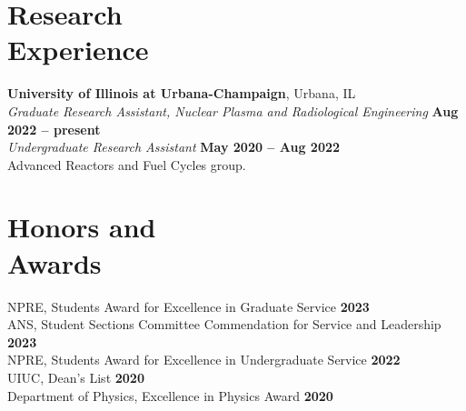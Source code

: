 \documentclass[margin,line]{resume}
\begin{document}
\begin{resume}
    \section{\mysidestyle Research\\Experience}
    \textbf{University of Illinois at Urbana-Champaign}, Urbana, IL\\
                \textsl{Graduate Research Assistant, Nuclear Plasma and Radiological Engineering} \hfill \textbf{Aug 2022 -- present}\\
                \textsl{Undergraduate Research Assistant} \hfill \textbf{May 2020 -- Aug 2022}\\
                Advanced Reactors and Fuel Cycles group.



    \section{\mysidestyle Honors and\\Awards}
                NPRE, Students Award for Excellence in Graduate Service \hfill \textbf{2023}\vspace{.5mm}\\%
                ANS, Student Sections Committee Commendation for Service and Leadership \hfill \textbf{2023}\vspace{.5mm}\\%
                NPRE, Students Award for Excellence in Undergraduate Service \hfill \textbf{2022}\vspace{.5mm}\\%
                UIUC, Dean's List \hfill \textbf{2020}\vspace{.5mm}\\%
                Department of Physics, Excellence in Physics Award \hfill \textbf{2020}\vspace{.5mm}\\%



\end{resume}
\end{document}
